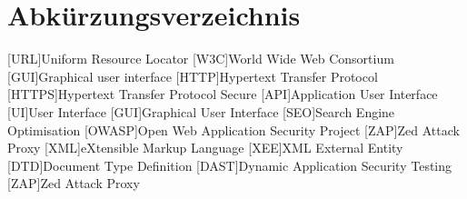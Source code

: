 \newpage
\chapter*{Abkürzungsverzeichnis}
\begin{acronym}
    [URL]{Uniform Resource Locator}
    [W3C]{World Wide Web Consortium}
    [GUI]{Graphical user interface}
    [HTTP]{Hypertext Transfer Protocol}
    [HTTPS]{Hypertext Transfer Protocol Secure}
    [API]{Application User Interface}
    [UI]{User Interface}
    [GUI]{Graphical User Interface}
    [SEO]{Search Engine Optimisation}
    [OWASP]{Open Web Application Security Project}
    [ZAP]{Zed Attack Proxy}
    [XML]{eXtensible Markup Language}
    [XEE]{XML External Entity}
    [DTD]{Document Type Definition}
    [DAST]{Dynamic Application Security Testing}
    [ZAP]{Zed Attack Proxy}
\end{acronym}